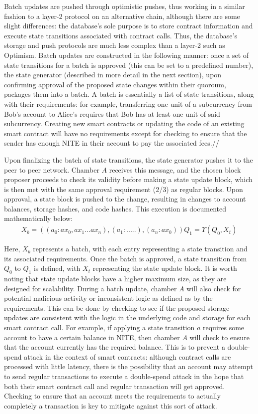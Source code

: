 \documentclass[conference]{IEEEtran}
\begin{document}
Batch updates are pushed through optimistic pushes, thus working in a similar fashion to a layer-2 protocol on an alternative chain, although there are some slight differences: the database's sole purpose is to store contract information and execute state transitions associated with contract calls. Thus, the database's storage and push protocols are much less complex than a layer-2 such as Optimism. Batch updates are constructed in the following manner: once a set of state transitions for a batch is approved (this can be set to a predefined number), the state generator (described in more detail in the next section), upon confirming approval of the proposed state changes within their quoroum, packages them into a batch. A batch is essentially a list of state transitions, along with their requirements: for example, transferring one unit of a subcurrency from Bob's account to Alice's requires that Bob has at least one unit of said subcurrency. Creating new smart contracts or updating the code of an existing smart contract will have no requirements except for checking to ensure that the sender has enough NITE in their account to pay the associated fees.//

Upon finalizing the batch of state transitions, the state generator pushes it to the peer to peer network. Chamber $A$ receives this message, and the chosen block proposer proceeds to check its validity before making a state update block, which is then met with the same approval requirement (2/3) as regular blocks. Upon approval, a state block is pushed to the change, resulting in changes to account balances, storage hashes, and code hashes. This execution is documented mathematically below:
\begin{eqnarray}
X_b = ((a_0:ax_0,ax_1...ax_n), (a_1:.....),(a_n:ax_0))
Q_1 = \Upsilon(Q_0, X_t)
\end{eqnarray}


Here, $X_b$ represents a batch, with each entry representing a state transition and its associated requirements. Once the batch is approved, a state transition from $Q_0$ to $Q_1$ is defined, with $X_t$ representing the state update block. It is worth noting that state update blocks have a higher maximum size, as they are designed for scalability. During a batch update, chamber $A$ will also check for potential malicious activity or inconsistent logic as defined as by the requirements. This can be done by checking to see if the proposed storage updates are consistent with the logic in the underlying code and storage for each smart contract call. For example, if applying a state transition $a$ requires some account to have a certain balance in NITE, then chamber $A$ will check to ensure that the account currently has the required balance. This is to prevent a double-spend attack in the context of smart contracts: although contract calls are processed with little latency, there is the possibility that an account may attempt to send regular transactions to execute a double-spend attack in the hope that both their smart contract call and regular transaction will get approved. Checking to ensure that an account meets the requirements to actually completely a transaction is key to mitigate against this sort of attack.
\end{document}
